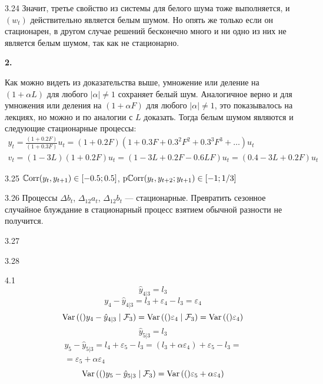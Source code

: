 \begin{solution}{{3.24}}
Значит, третье свойство из системы для белого шума тоже выполняется, и $(w_t)$ действительно является белым шумом. Но опять же только если он стационарен, в другом случае решений бесконечно много и ни одно из них не является белым шумом, так как не стационарно.

\textbf{2.}

Как можно видеть из доказательства выше, умножение или деление на $(1 + \alpha L)$ для любого $|\alpha| \neq 1$ сохраняет белый шум. Аналогичное верно и для умножения или деления на $(1 + \alpha F)$ для любого $|\alpha| \neq 1$, это показывалось на лекциях, но можно и по аналогии с $L$ доказать. Тогда белым шумом являются и следующие стационарные процессы:
\begin{gather*}
    y_t = \frac{(1 + 0.2F)}{(1 + 0.3F)} u_t = (1 + 0.2F)(1 + 0.3F + 0.3^2F^2 + 0.3^3 F^3 + \ldots) u_t\\
    v_t = (1 - 3L)(1 + 0.2 F) u_t = (1 - 3L + 0.2F - 0.6LF)u_t = (0.4 - 3L + 0.2F) u_t
\end{gather*}
  
\end{solution}
\protect \hypertarget {soln:3.25}{}
\begin{solution}{{3.25}}
    $\operatorname{\mathbb{C}\mathrm{orr}}(y_t, y_{t+1}) \in [-0.5; 0.5]$, $\operatorname{\mathrm{p}\mathbb{C}\mathrm{orr}}(y_t, y_{t+2} ; y_{t+1}) \in [-1; 1/3]$
  
\end{solution}
\protect \hypertarget {soln:3.26}{}
\begin{solution}{{3.26}}
    Процессы $\Delta b_t$, $\Delta_{12} a_t$, $\Delta_{12} b_t$ — стационарные.
    Превратить сезонное случайное блуждание в стационарный процесс взятием обычной разности не получится.
  
\end{solution}
\protect \hypertarget {soln:3.27}{}
\begin{solution}{{3.27}}
  
\end{solution}
\protect \hypertarget {soln:3.28}{}
\begin{solution}{{3.28}}
  
\end{solution}
\protect \hypertarget {soln:4.1}{}
\begin{solution}{{4.1}}
  \[
    \hat y_{4|3} = l_3
  \]
  \[
    y_4 - \hat y_{4|3} = l_3 + \varepsilon_4 - l_3 = \varepsilon_4
  \]
  \[
  \operatorname{Var}{\left((\right)}y_4 - \hat y_{4|3} \mid \mathcal{F}_3) = \operatorname{Var}{\left((\right)}\varepsilon_4 \mid \mathcal{F}_3) = \operatorname{Var}{\left((\right)}\varepsilon_4)
  \]
  \[
  \hat y_{5|3} = l_3
  \]
  \begin{multline}
  y_5 - \hat y_{5|3} = l_4  + \varepsilon_5 - l_3  = (l_3 + \alpha \varepsilon_4)  +
   \varepsilon_5 - l_3 = \\
  = \varepsilon_5 + \alpha  \varepsilon_4
  \end{multline}
  \[
  \operatorname{Var}{\left((\right)}y_5 - \hat y_{5|3} \mid \mathcal{F}_3) = \operatorname{Var}{\left((\right)}\varepsilon_5 + \alpha  \varepsilon_4 )
  \]

\end{solution}
